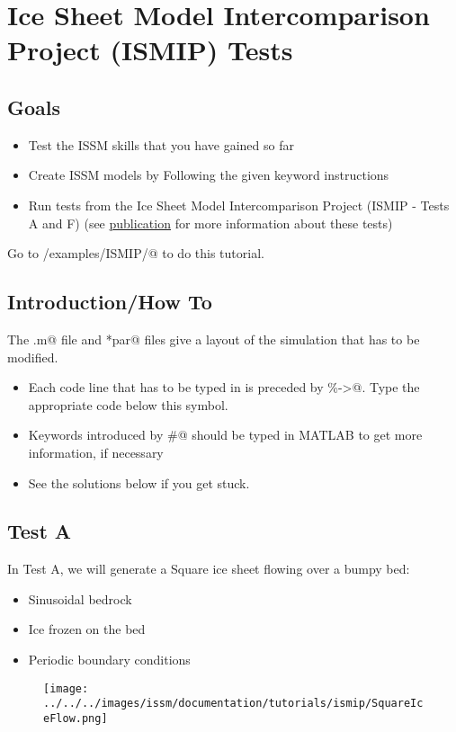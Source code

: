 \section{Ice Sheet Model Intercomparison Project (ISMIP) Tests}
\subsection{Goals} %
\begin{itemize}
	\item Test the ISSM skills that you have gained so far
	\item Create ISSM models by Following the given keyword instructions
	\item Run tests from the Ice Sheet Model Intercomparison Project (ISMIP - Tests A and F) (see \href{https://tc.copernicus.org/articles/2/95/2008/}{publication} for more information about these tests)
\end{itemize}

Go to \verb@trunk/examples/ISMIP/@ to do this tutorial.

\subsection{Introduction/How To} %
The \verb@runme.m@ file and \verb@*par@ files give a layout of the simulation that has to be modified.
\begin{itemize}
	\item Each code line that has to be typed in is preceded by \verb@\%->@. Type the appropriate code below this symbol.
	\item Keywords introduced by \verb@#@ should be typed in MATLAB to get more information, if necessary
	\item See the solutions below if you get stuck.
\end{itemize}
\subsection{Test A} %
In Test A, we will generate a Square ice sheet flowing over a bumpy bed:
\begin{itemize}
	\item Sinusoidal bedrock
	\item Ice frozen on the bed
	\item Periodic boundary conditions
\end{itemize}
\begin{figure}[H]
	\begin{center}
		\texttt{[image: ../../../images/issm/documentation/tutorials/ismip/SquareIceFlow.png]}
	\end{center}
\end{figure}
